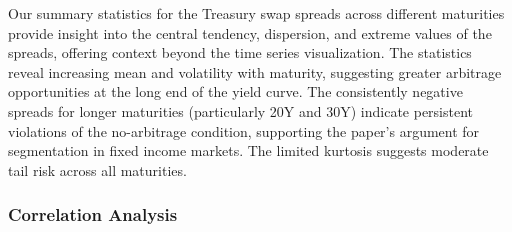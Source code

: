 \documentclass[12pt]{article}
\begin{document}

Our summary statistics for the Treasury swap spreads across different maturities provide insight into the central tendency, dispersion, and extreme values of the spreads, offering context beyond the time series visualization. The statistics reveal increasing mean and volatility with maturity, suggesting greater arbitrage opportunities at the long end of the yield curve. The consistently negative spreads for longer maturities (particularly 20Y and 30Y) indicate persistent violations of the no-arbitrage condition, supporting the paper's argument for segmentation in fixed income markets. The limited kurtosis suggests moderate tail risk across all maturities.

\subsubsection{Correlation Analysis}
\end{document}
